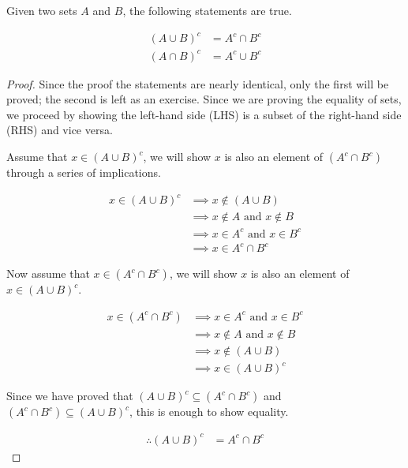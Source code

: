 \begin{theorem}
	Given two sets $A$ and $B$, the following statements are true.
	
	\begin{align}
		(A \cup B)^c &= A^c \cap B^c \\
		(A \cap B)^c &= A^c \cup B^c
	\end{align}
\end{theorem}

\begin{proof}
	Since the proof the statements are nearly identical, only the first will be proved; the second is left as an exercise. Since we are proving the equality of sets, we proceed by showing the left-hand side (LHS) is a subset of the right-hand side (RHS) and vice versa.
	
	
	Assume that $x \in (A \cup B)^c$, we will show $x$ is also an element of $(A^c \cap B^c)$ through a series of implications.
	
	\begin{align*}
		x \in (A \cup B)^c &\implies x \notin (A \cup B) \\
		&\implies x \notin A \text{ and } x \notin B \\
		&\implies x \in A^c \text{ and } x \in B^c \\
		&\implies x \in A^c \cap B^c
	\end{align*}
		
	
	Now assume that $x \in (A^c \cap B^c)$, we will show $x$ is also an element of $x \in (A \cup B)^c$.
	
	\begin{align*}
		x \in (A^c \cap B^c) &\implies x \in A^c \text{ and } x \in B^c \\
		&\implies x \notin A \text{ and } x \notin B \\
		&\implies x \notin (A \cup B) \\
		&\implies x \in (A \cup B)^c
	\end{align*}
	
	Since we have proved that $(A \cup B)^c \subseteq (A^c \cap B^c)$ and $(A^c \cap B^c) \subseteq (A \cup B)^c$, this is enough to show equality.
	
	\begin{align*}
		\therefore (A \cup B)^c &= A^c \cap B^c
	\end{align*}
\end{proof}
\vspace{\baselineskip}

